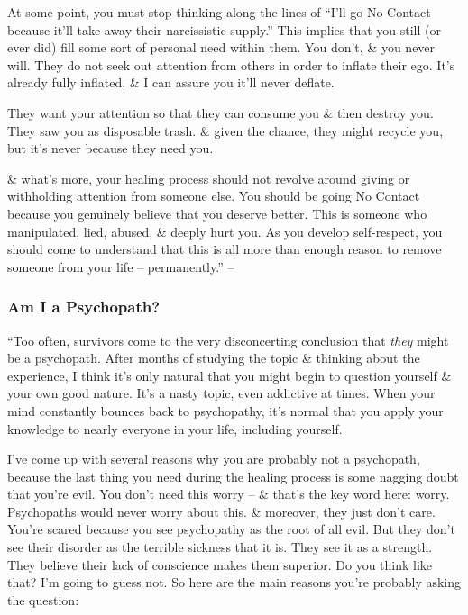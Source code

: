 \documentclass{article}
\numberwithin{equation}{section}
\begin{document}
At some point, you must stop thinking along the lines of ``I'll go No Contact because it'll take away their narcissistic supply.'' This implies that you still (or ever did) fill some sort of personal need within them. You don't, \& you never will. They do not seek out attention from others in order to inflate their ego. It's already fully inflated, \& I can assure you it'll never deflate.

They want your attention so that they can consume you \& then destroy you. They saw you as disposable trash. \& given the chance, they might recycle you, but it's never because they need you.

\& what's more, your healing process should not revolve around giving or withholding attention from someone else. You should be going No Contact because you genuinely believe that you deserve better. This is someone who manipulated, lied, abused, \& deeply hurt you. As you develop self-respect, you should come to understand that this is all more than enough reason to remove someone from your life -- permanently.'' -- \cite[pp. 114--115]{MacKenzie2015}

\subsubsection{Am I a Psychopath?}
``Too often, survivors come to the very disconcerting conclusion that \textit{they} might be a psychopath. After months of studying the topic \& thinking about the experience, I think it's only natural that you might begin to question yourself \& your own good nature. It's a nasty topic, even addictive at times. When your mind constantly bounces back to psychopathy, it's normal that you apply your knowledge to nearly everyone in your life, including yourself.

I've come up with several reasons why you are probably not a psychopath, because the last thing you need during the healing process is some nagging doubt that you're evil. You don't need this worry -- \& that's the key word here: worry. Psychopaths would never worry about this. \& moreover, they just don't care. You're scared because you see psychopathy as the root of all evil. But they don't see their disorder as the terrible sickness that it is. They see it as a strength. They believe their lack of conscience makes them superior. Do you think like that? I'm going to guess not. So here are the main reasons you're probably asking the question:
\end{document}
